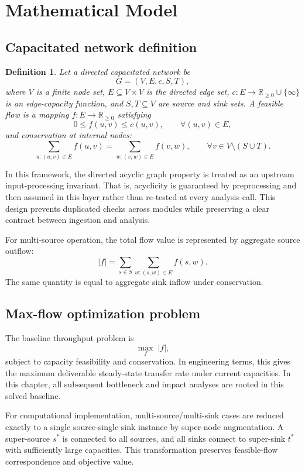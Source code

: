 \documentclass[12pt]{report}
\newtheorem{definition}{Definition}[chapter]
\begin{document}
\section{Mathematical Model}

\subsection{Capacitated network definition}

\begin{definition}
Let a directed capacitated network be
\[
G=(V,E,c,S,T),
\]
where $V$ is a finite node set, $E\subseteq V\times V$ is the directed edge set, $c:E\to \mathbb{R}_{\ge 0}\cup\{\infty\}$ is an edge-capacity function, and $S,T\subseteq V$ are source and sink sets. A feasible flow is a mapping $f:E\to \mathbb{R}_{\ge 0}$ satisfying
\[
0\le f(u,v)\le c(u,v),\qquad \forall (u,v)\in E,
\]
and conservation at internal nodes:
\[
\sum_{u:(u,v)\in E} f(u,v)=\sum_{w:(v,w)\in E} f(v,w),\qquad \forall v\in V\setminus(S\cup T).
\]
\end{definition}

In this framework, the directed acyclic graph property is treated as an upstream input-processing invariant. That is, acyclicity is guaranteed by preprocessing and then assumed in this layer rather than re-tested at every analysis call. This design prevents duplicated checks across modules while preserving a clear contract between ingestion and analysis.

For multi-source operation, the total flow value is represented by aggregate source outflow:
\[
|f|=\sum_{s\in S}\sum_{w:(s,w)\in E} f(s,w).
\]
The same quantity is equal to aggregate sink inflow under conservation.

\subsection{Max-flow optimization problem}

The baseline throughput problem is
\[
\max_f\;|f|,
\]
subject to capacity feasibility and conservation. In engineering terms, this gives the maximum deliverable steady-state transfer rate under current capacities. In this chapter, all subsequent bottleneck and impact analyses are rooted in this solved baseline.

For computational implementation, multi-source/multi-sink cases are reduced exactly to a single source-single sink instance by super-node augmentation. A super-source $s^*$ is connected to all sources, and all sinks connect to super-sink $t^*$ with sufficiently large capacities. This transformation preserves feasible-flow correspondence and objective value.
\end{document}
